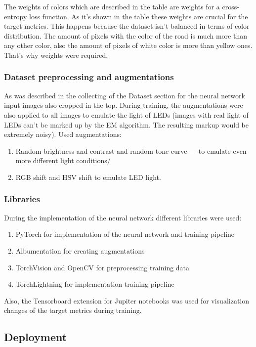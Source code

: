 The weights of colors which are described in the table are weights for a cross-entropy loss function. As it's shown in the table these weights are crucial 
for the target metrics. This happens because the dataset isn't balanced in terms of color distribution. The amount of pixels with the color of the road is much more 
than any other color, also the amount of pixels of white color is more than yellow ones. That's why weights were required. 

\subsubsection{Dataset preprocessing and augmentations}

As was described in the collecting of the Dataset section for the neural network input images also cropped in the top. 
During training, the augmentations were also applied to all images to emulate the light of LEDs (images with real light of LEDs can't be marked up by the EM algorithm.
The resulting markup would be extremely noisy).
Used augmentations:
\begin{enumerate}
    \item Random brightness and contrast and random tone curve --- to emulate even more different light conditions/
    \item RGB shift and HSV shift to emulate LED light.
\end{enumerate}
\subsubsection{Libraries}
During the implementation of the neural network different libraries were used:
\begin{enumerate}
    \item PyTorch for implementation of the neural network and training pipeline
    \item Albumentation for creating augmentations
    \item TorchVision and OpenCV for preprocessing training data
    \item TorchLightning for implementation training pipeline
\end{enumerate}
Also, the Tensorboard extension for Jupiter notebooks was used for visualization changes of the target metrics during training.

\subsection{Deployment}
